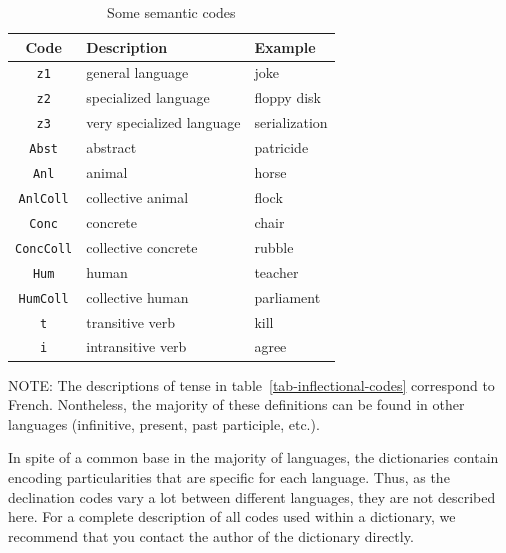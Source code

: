 \begin{table}[!h]
\begin{center}
\begin{tabular}{|c|l|l|}
\hline
\textbf{Code} & \textbf{Description} & \textbf{Example} \\
\hline
\verb+z1+ & general language & joke \\
\hline
\verb+z2+ & specialized language & floppy disk \\
\hline
\verb+z3+ & very specialized language & serialization \\
\hline
\verb+Abst+ & abstract & patricide \\
\hline
\verb+Anl+ & animal & horse \\
\hline
\verb+AnlColl+ & collective animal & flock \\
\hline
\verb+Conc+ & concrete & chair \\
\hline
\verb+ConcColl+ & collective concrete & rubble \\
\hline
\verb+Hum+ & human & teacher \\
\hline
\verb+HumColl+ & collective human & parliament \\
\hline
\verb+t+ & transitive verb & kill \\
\hline
\verb+i+ & intransitive verb & agree \\
\hline
\end{tabular}
\caption{Some semantic codes\label{tab-semantic-codes}}
\end{center}
\end{table}

\bigskip
\noindent NOTE: The  descriptions of tense in
table~\ref{tab-inflectional-codes} correspond to French.
Nontheless, the majority of these definitions can be found in other languages (infinitive, present, past participle, etc.).

\bigskip
\noindent In spite of a common base in the majority of languages, the dictionaries
contain encoding particularities that are specific for each language. Thus, as
the declination codes vary a lot between different languages, they are not
described here. For a complete description of all codes used within a dictionary,
we recommend that you  contact the author of the dictionary directly.

